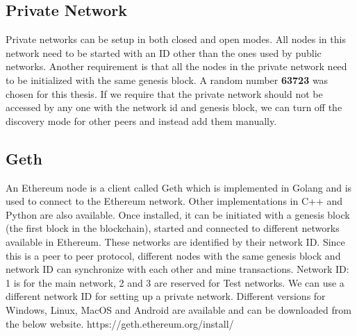 \documentclass[11pt,openright]{report}
\begin{document}
\subsection{Private Network}
Private networks can be setup in both closed and open modes. All nodes in this network need to be started with an ID other than the ones used by public networks. Another requirement is that all the nodes in the private network need to be initialized with the same genesis block. A random number \textbf{63723} was chosen for this thesis. If we require that the private network should not be accessed by any one with the network id and genesis block, we can turn off the discovery mode for other peers and instead add them manually.

\subsection{Geth}
An Ethereum node is a client called Geth which is implemented in Golang and is used to connect to the Ethereum network. Other implementations in C++ and Python are also available. Once installed, it can be initiated with a genesis block (the first block in the blockchain), started and connected to different networks available in Ethereum. These networks are identified by their network ID. Since this is a peer to peer protocol, different nodes with the same genesis block and network ID can synchronize with each other and mine transactions. Network ID: 1 is for the main network, 2 and 3 are reserved for Test networks. We can use a different network ID for setting up a private network. Different versions for Windows, Linux, MacOS and Android are available and can be downloaded from the below website.
https://geth.ethereum.org/install/
\end{document}
